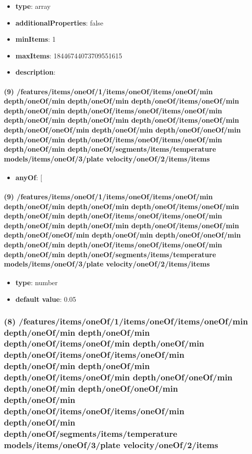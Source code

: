 \begin{itemize}[leftmargin=8em]\item {\bf type}: array
\item {\bf additionalProperties}: false
\item {\bf minItems}: 1
\item {\bf maxItems}: 18446744073709551615
\item {\bf description}: 
\end{itemize}\paragraph{(9) /features/items/oneOf/1/items/oneOf/items/oneOf/min depth/oneOf/min depth/oneOf/min depth/oneOf/items/oneOf/min depth/oneOf/min depth/oneOf/items/oneOf/items/oneOf/min depth/oneOf/min depth/oneOf/min depth/oneOf/items/oneOf/min depth/oneOf/oneOf/min depth/oneOf/min depth/oneOf/oneOf/min depth/oneOf/min depth/oneOf/items/oneOf/items/oneOf/min depth/oneOf/min depth/oneOf/segments/items/temperature models/items/oneOf/3/plate velocity/oneOf/2/items/items}
\begin{itemize}[leftmargin=9em]\item {\bf anyOf}: [\end{itemize}\paragraph{(9) /features/items/oneOf/1/items/oneOf/items/oneOf/min depth/oneOf/min depth/oneOf/min depth/oneOf/items/oneOf/min depth/oneOf/min depth/oneOf/items/oneOf/items/oneOf/min depth/oneOf/min depth/oneOf/min depth/oneOf/items/oneOf/min depth/oneOf/oneOf/min depth/oneOf/min depth/oneOf/oneOf/min depth/oneOf/min depth/oneOf/items/oneOf/items/oneOf/min depth/oneOf/min depth/oneOf/segments/items/temperature models/items/oneOf/3/plate velocity/oneOf/2/items/items}
\begin{itemize}[leftmargin=9em]\item {\bf type}: number\item {\bf default value}: 0.05
\end{itemize}\subsubsection{(8) /features/items/oneOf/1/items/oneOf/items/oneOf/min depth/oneOf/min depth/oneOf/min depth/oneOf/items/oneOf/min depth/oneOf/min depth/oneOf/items/oneOf/items/oneOf/min depth/oneOf/min depth/oneOf/min depth/oneOf/items/oneOf/min depth/oneOf/oneOf/min depth/oneOf/min depth/oneOf/oneOf/min depth/oneOf/min depth/oneOf/items/oneOf/items/oneOf/min depth/oneOf/min depth/oneOf/segments/items/temperature models/items/oneOf/3/plate velocity/oneOf/2/items}
